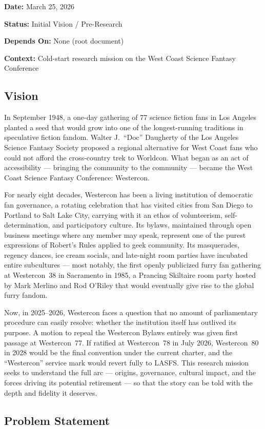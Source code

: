 \documentclass[11pt,letterpaper]{article}
\newcommand{\metafield}[2]{\textbf{\sffamily #1} #2\par}
\begin{document}
\metafield{Date:}{March 25, 2026}
\metafield{Status:}{Initial Vision / Pre-Research}
\metafield{Depends On:}{None (root document)}
\metafield{Context:}{Cold-start research mission on the West Coast Science Fantasy Conference}

\subsection{Vision}

In September 1948, a one-day gathering of 77 science fiction fans in Los Angeles planted a seed that would grow into one of the longest-running traditions in speculative fiction fandom. Walter J.\ ``Doc'' Daugherty of the Los Angeles Science Fantasy Society proposed a regional alternative for West Coast fans who could not afford the cross-country trek to Worldcon. What began as an act of accessibility --- bringing the community to the community --- became the West Coast Science Fantasy Conference: Westercon.

For nearly eight decades, Westercon has been a living institution of democratic fan governance, a rotating celebration that has visited cities from San Diego to Portland to Salt Lake City, carrying with it an ethos of volunteerism, self-determination, and participatory culture. Its bylaws, maintained through open business meetings where any member may speak, represent one of the purest expressions of Robert's Rules applied to geek community. Its masquerades, regency dances, ice cream socials, and late-night room parties have incubated entire subcultures --- most notably, the first openly publicized furry fan gathering at Westercon~38 in Sacramento in 1985, a Prancing Skiltaire room party hosted by Mark Merlino and Rod O'Riley that would eventually give rise to the global furry fandom.

Now, in 2025--2026, Westercon faces a question that no amount of parliamentary procedure can easily resolve: whether the institution itself has outlived its purpose. A motion to repeal the Westercon Bylaws entirely was given first passage at Westercon~77. If ratified at Westercon~78 in July 2026, Westercon~80 in 2028 would be the final convention under the current charter, and the ``Westercon'' service mark would revert fully to LASFS. This research mission seeks to understand the full arc --- origins, governance, cultural impact, and the forces driving its potential retirement --- so that the story can be told with the depth and fidelity it deserves.

\subsection{Problem Statement}
\end{document}
